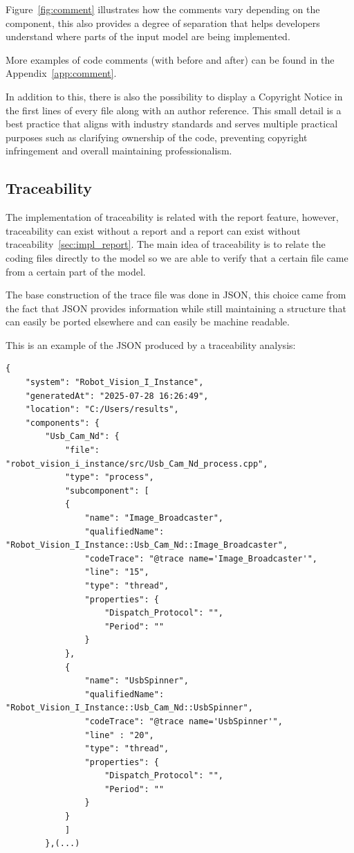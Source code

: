 Figure~\ref{fig:comment} illustrates how the comments vary depending on the component, this also provides a degree of separation that helps developers understand where parts of the input model are being implemented.

More examples of code comments (with before and after) can be found in the Appendix~\ref{app:comment}.

In addition to this, there is also the possibility to display a Copyright Notice in the first lines of every file along with an author reference. This small detail is a best practice that aligns with industry standards and serves multiple practical purposes such as clarifying ownership of the code, preventing copyright infringement and overall maintaining professionalism.


\subsection{Traceability}
\label{sec:impl_trace}

The implementation of traceability is related with the report feature, however, traceability can exist without a report and a report can exist without traceability~\ref{sec:impl_report}. The main idea of traceability is to relate the coding files directly to the model so we are able to verify that a certain file came from a certain part of the model.

The base construction of the trace file was done in \gls{JSON}, this choice came from the fact that \gls{JSON} provides information while still maintaining a structure that can easily be ported elsewhere and can easily be machine readable.

This is an example of the \gls{JSON} produced by a traceability analysis:

\begin{verbatim}
{
	"system": "Robot_Vision_I_Instance",
	"generatedAt": "2025-07-28 16:26:49",
	"location": "C:/Users/results",
	"components": {
		"Usb_Cam_Nd": {
			"file": "robot_vision_i_instance/src/Usb_Cam_Nd_process.cpp",
			"type": "process",
			"subcomponent": [
			{
				"name": "Image_Broadcaster",
				"qualifiedName": "Robot_Vision_I_Instance::Usb_Cam_Nd::Image_Broadcaster",
				"codeTrace": "@trace name='Image_Broadcaster'",
				"line": "15",
				"type": "thread",
				"properties": {
					"Dispatch_Protocol": "",
					"Period": ""
				}
			},
			{
				"name": "UsbSpinner",
				"qualifiedName": "Robot_Vision_I_Instance::Usb_Cam_Nd::UsbSpinner",
				"codeTrace": "@trace name='UsbSpinner'",
				"line" : "20",
				"type": "thread",
				"properties": {
					"Dispatch_Protocol": "",
					"Period": ""
				}
			}
			]
		},(...)
\end{verbatim}


